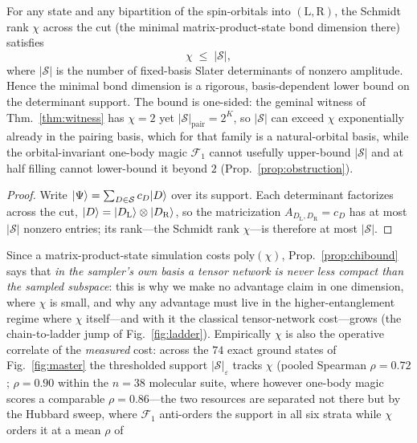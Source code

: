 \begin{proposition}
\label{prop:chibound}
For any state and any bipartition of the spin-orbitals into $(\mathrm L,\mathrm R)$, the Schmidt rank
$\chi$ across the cut (the minimal matrix-product-state bond dimension there) satisfies
\begin{equation}
\chi \;\le\; |\mathcal S|,
\end{equation}
where $|\mathcal S|$ is the number of fixed-basis Slater determinants of nonzero amplitude. Hence the
minimal bond dimension is a rigorous, basis-dependent lower bound on the determinant support. The bound is
one-sided: the geminal witness of Thm.~\ref{thm:witness} has $\chi=2$ yet $|\mathcal S|_{\mathrm{pair}}=2^{K}$,
so $|\mathcal S|$ can exceed $\chi$ exponentially already in the pairing basis, which for that family is
a natural-orbital basis, while the orbital-invariant one-body magic $\mathcal F_1$ cannot usefully
upper-bound $|\mathcal S|$ and at half filling cannot lower-bound it beyond $2$
(Prop.~\ref{prop:obstruction}).
\end{proposition}
\begin{proof}
Write $\lvert \Psi \rangle=\sum_{D\in\mathcal S}c_D\lvert D \rangle$ over its support. Each determinant factorizes across the
cut, $\lvert D \rangle=\lvert D_{\mathrm L} \rangle\otimes\lvert D_{\mathrm R} \rangle$, so the matricization
$A_{D_{\mathrm L},D_{\mathrm R}}=c_D$ has at most $|\mathcal S|$ nonzero entries; its rank---the Schmidt
rank $\chi$---is therefore at most $|\mathcal S|$.
\end{proof}
\noindent Since a matrix-product-state simulation costs $\mathrm{poly}(\chi)$, Prop.~\ref{prop:chibound}
says that \emph{in the sampler's own basis a tensor network is never less compact than the sampled
subspace}: this is why we make no advantage claim in one dimension, where $\chi$ is small, and why
any advantage must live in the higher-entanglement regime where $\chi$ itself---and with it the classical
tensor-network cost---grows (the chain-to-ladder jump of Fig.~\ref{fig:ladder}). Empirically $\chi$ is also the
operative correlate of the \emph{measured} cost: across the $74$ exact ground states of
Fig.~\ref{fig:master} the thresholded support $|\mathcal S|_\varepsilon$ tracks $\chi$ (pooled Spearman
$\rho=0.72$; $\rho=0.90$ within the $n=38$ molecular suite, where however one-body magic scores a
comparable $\rho=0.86$---the two resources are separated not there but by the Hubbard sweep, where
$\mathcal F_1$ anti-orders the support in all six strata while $\chi$ orders it at a mean $\rho$ of
